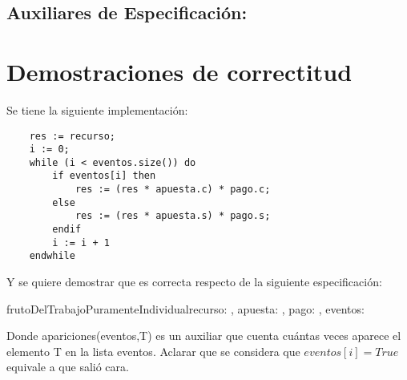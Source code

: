 \documentclass[10pt,a4paper]{article}
\begin{document}
\subsection{Auxiliares de Especificación:}

	{
	}

	{
	}
	{
	}

\section{Demostraciones de correctitud}

 Se tiene la siguiente implementación:

\vspace{0.3cm}

\begin{lstlisting}
	res := recurso;
	i := 0;
	while (i < eventos.size()) do
		if eventos[i] then
			res := (res * apuesta.c) * pago.c;
		else
			res := (res * apuesta.s) * pago.s;
		endif
		i := i + 1
	endwhile
\end{lstlisting}

\vspace{0.3cm}

 Y se quiere demostrar que es correcta respecto de la siguiente especificación:
\begin{proc}{frutoDelTrabajoPuramenteIndividual}{\In recurso: \float, \In apuesta: , \In pago: , \In eventos: \TLista{\bool} }{\float}



\end{proc}

\vspace{0.3cm}

 Donde apariciones(eventos,T) es un auxiliar que cuenta cuántas veces aparece el elemento T en la lista eventos.
 Aclarar que se considera que $eventos[i] = True$ equivale a que salió cara.
\end{document}
